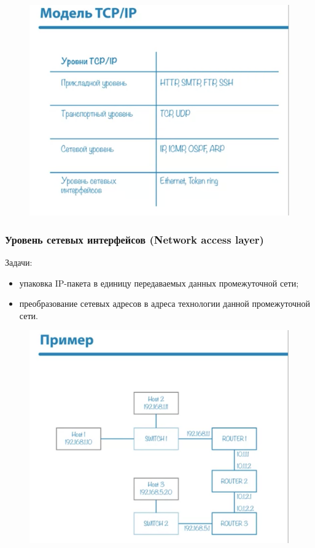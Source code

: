 \documentclass[a4paper,12pt]{article}
\begin{document}
	\begin{figure}[h!]
		\begin{center}
			{\includegraphics[scale = 0.4]{2.png}}
			\label{2}
		\end{center}
	\end{figure}


	\subsubsection{Уровень сетевых интерфейсов (Network access layer)}
	
	Задачи:
	
	\begin{itemize}
		\item упаковка IP-пакета в единицу передаваемых данных промежуточной сети;
		\item преобразование сетевых адресов в адреса технологии данной промежуточной сети.
	\end{itemize}

	\begin{figure}[h!]
		\begin{center}
			{\includegraphics[scale = 0.4]{3.png}}
			\label{3}
		\end{center}
	\end{figure}
\end{document}
